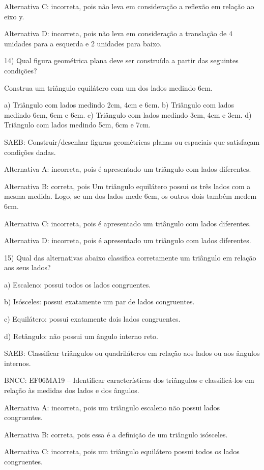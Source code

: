 Alternativa C: incorreta, pois não leva em consideração a reflexão em
relação ao eixo y.

Alternativa D: incorreta, pois não leva em consideração a translação de
4 unidades para a esquerda e 2 unidades para baixo.

14) Qual figura geométrica plana deve ser construída a partir das
seguintes condições?

Construa um triângulo equilátero com um dos lados medindo 6cm.

a) Triângulo com lados medindo 2cm, 4cm e 6cm. b) Triângulo com lados
medindo 6cm, 6cm e 6cm. c) Triângulo com lados medindo 3cm, 4cm e 3cm.
d) Triângulo com lados medindo 5cm, 6cm e 7cm.

SAEB: Construir/desenhar figuras geométricas planas ou espaciais que
satisfaçam condições dadas.

Alternativa A: incorreta, pois é apresentado um triângulo com lados
diferentes.

Alternativa B: correta, pois Um triângulo equilátero possui os três
lados com a mesma medida. Logo, se um dos lados mede 6cm, os outros dois
também medem 6cm.

Alternativa C: incorreta, pois é apresentado um triângulo com lados
diferentes.

Alternativa D: incorreta, pois é apresentado um triângulo com lados
diferentes.

15) Qual das alternativas abaixo classifica corretamente um triângulo em
relação aos seus lados?

a) Escaleno: possui todos os lados congruentes.

b) Isósceles: possui exatamente um par de lados congruentes.

c) Equilátero: possui exatamente dois lados congruentes.

d) Retângulo: não possui um ângulo interno reto.

SAEB: Classificar triângulos ou quadriláteros em relação aos lados ou
aos ângulos internos.

BNCC: EF06MA19 -- Identificar características dos triângulos e
classificá-los em relação às medidas dos lados e dos ângulos.

Alternativa A: incorreta, pois um triângulo escaleno não possui lados
congruentes.

Alternativa B: correta, pois essa é a definição de um triângulo
isósceles.

Alternativa C: incorreta, pois um triângulo equilátero possui todos os
lados congruentes.

